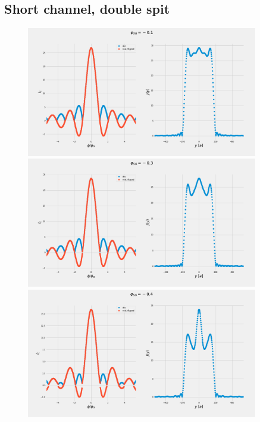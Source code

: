 \documentclass[a4paper]{article}
\begin{document}
\subsection{Short channel, double spit}
\begin{figure}
\includegraphics[width=0.9\textwidth]{figs/wg32double/current_and_density_01}
\includegraphics[width=0.9\textwidth]{figs/wg32double/current_and_density_03}
\includegraphics[width=0.9\textwidth]{figs/wg32double/current_and_density_04}
\end{figure}
\end{document}
